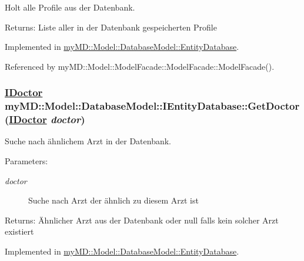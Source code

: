 Holt alle Profile aus der Datenbank. 

\begin{Desc}
\item[Returns:]Liste aller in der Datenbank gespeicherten Profile\end{Desc}


Implemented in \hyperlink{classmy_m_d_1_1_model_1_1_database_model_1_1_entity_database_cdd42df8b8413bdd0cd36422d4e3f33c}{my\-MD::Model::Database\-Model::Entity\-Database}.

Referenced by my\-MD::Model::Model\-Facade::Model\-Facade::Model\-Facade().\hypertarget{interfacemy_m_d_1_1_model_1_1_database_model_1_1_i_entity_database_cc41e08b876f7f88b63138dc9ee26aea}{
\subsubsection[GetDoctor]{\setlength{\rightskip}{0pt plus 5cm}\hyperlink{interfacemy_m_d_1_1_model_interface_1_1_data_model_interface_1_1_i_doctor}{IDoctor} my\-MD::Model::Database\-Model::IEntity\-Database::Get\-Doctor (\hyperlink{interfacemy_m_d_1_1_model_interface_1_1_data_model_interface_1_1_i_doctor}{IDoctor} {\em doctor})}}
\label{d3/da9/interfacemy_m_d_1_1_model_1_1_database_model_1_1_i_entity_database_cc41e08b876f7f88b63138dc9ee26aea}


Suche nach \"{a}hnlichem Arzt in der Datenbank. 

\begin{Desc}
\item[Parameters:]
\begin{description}
\item[{\em doctor}]Suche nach Arzt der \"{a}hnlich zu diesem Arzt ist\end{description}
\end{Desc}
\begin{Desc}
\item[Returns:]\"{A}hnlicher Arzt aus der Datenbank oder null falls kein solcher Arzt existiert\end{Desc}


Implemented in \hyperlink{classmy_m_d_1_1_model_1_1_database_model_1_1_entity_database_cc41e08b876f7f88b63138dc9ee26aea}{my\-MD::Model::Database\-Model::Entity\-Database}.

